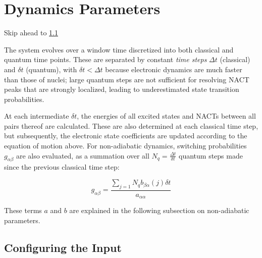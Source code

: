 \documentclass[12pt,letter,footinclude=true,headinclude=true,hyphens]{book} %
\begin{document}
    \section{Dynamics Parameters}
    \label{dynamics-parameters}
    
    Skip ahead to \ref{dynamics-parameters-input}
    
    The system evolves over a window time discretized into both classical and quantum time points. These are separated by constant \emph{time steps} $\Delta t$ (classical) and $\delta t$ (quantum), with $\delta t < \Delta t$ because electronic dynamics are much faster than those of nuclei; large quantum steps are not sufficient for resolving NACT peaks that are strongly localized, leading to underestimated state transition probabilities.
    
    At each intermediate $\delta t$, the energies of all excited states and NACTs between all pairs thereof are calculated. These are also determined at each classical time step, but subsequently, the electronic state coefficients are updated according to the equation of motion above. For non-adiabatic dynamics, switching probabilities $g_{\alpha \beta}$ are also evaluated, as a summation over all $N_q = \frac{\Delta t}{\delta t}$ quantum steps made since the previous classical time step:
    
    \begin{equation}
    g_{\alpha \beta} = \frac{\sum_{j=1}{N_q} b_{\beta \alpha}(j) \delta t}{a_{\alpha \alpha}}
    \end{equation}
    
    These terms $a$ and $b$ are explained in the following subsection on non-adiabatic parameters.
    
    \subsection{Configuring the Input}
    \label{dynamics-parameters-input}
    
\end{document}
